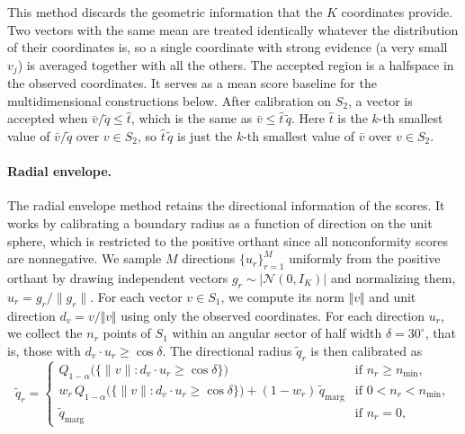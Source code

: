 This method discards the geometric information that the $K$ coordinates provide. Two vectors with the same mean are treated 
identically whatever the distribution of their coordinates is, so a single coordinate with strong evidence (a very small $v_j$) is 
averaged together with all the others. The accepted region is a halfspace in the observed coordinates. It serves as a mean score baseline 
for the multidimensional constructions below. After calibration on $S_2$, a vector is accepted when $\bar v/\tilde q\le\hat t$, 
which is the same as $\bar v\le\hat t\,\tilde q$. Here $\hat t$ is the $k$-th smallest value of $\bar v/\tilde q$ over $v\in S_2$, 
so $\hat t\,\tilde q$ is just the $k$-th smallest value of $\bar v$ over $v\in S_2$. 



 
\paragraph{Radial envelope.} The radial envelope method retains the directional information of the scores. It works by calibrating 
a boundary radius as a function of direction on the unit sphere, which is restricted to the positive orthant since all nonconformity 
scores are nonnegative. We sample $M$ directions $\{u_r\}_{r=1}^M$ uniformly from the positive orthant by drawing independent vectors $g_r\sim|\mathcal 
N(0,I_K)|$ and normalizing them, $u_r=g_r/\|g_r\|$. For each vector $v\in S_1$, we compute its norm $\Vert{}v\Vert{}$ and  
unit direction $d_v = v / \Vert{}v\Vert{}$ using only the observed coordinates.
For each direction $u_r$, we collect the $n_r$ points of $S_1$ within an angular sector of half width $\delta=30^\circ$, that is, 
those with $d_v\cdot u_r\ge\cos\delta$. The directional radius $\tilde q_r$ is then calibrated as
\begin{equation}\label{eq:radii}
\tilde q_r=\begin{cases}
Q_{1-\alpha}\bigl(\{\|v\|:d_v\cdot u_r\ge\cos\delta\}\bigr) & \text{if } n_r\ge n_{\min},\\[1ex]
w_r\,Q_{1-\alpha}\bigl(\{\|v\|:d_v\cdot u_r\ge\cos\delta\}\bigr)+(1-w_r)\,\tilde q_{\mathrm{marg}} & \text{if } 
0<n_r<n_{\min},\\[1ex]
\tilde q_{\mathrm{marg}} & \text{if } n_r=0,
\end{cases}
\end{equation}

